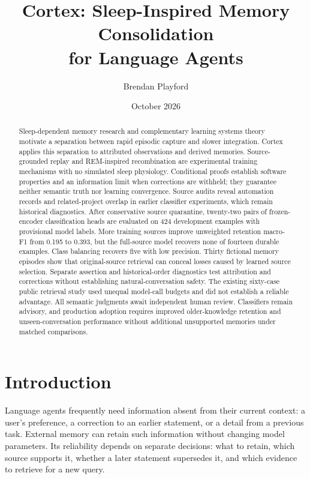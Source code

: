 \documentclass[11pt]{article}
\title{Cortex: Sleep-Inspired Memory Consolidation\\for Language Agents}
\author{Brendan Playford}
\date{October 2026}
\begin{document}
\maketitle
\begin{abstract}
Sleep-dependent memory research and complementary learning systems theory motivate a separation between rapid episodic capture and slower integration. Cortex applies this separation to attributed observations and derived memories. Source-grounded replay and REM-inspired recombination are experimental training mechanisms with no simulated sleep physiology. Conditional proofs establish software properties and an information limit when corrections are withheld; they guarantee neither semantic truth nor learning convergence. Source audits reveal automation records and related-project overlap in earlier classifier experiments, which remain historical diagnostics. After conservative source quarantine, twenty-two pairs of frozen-encoder classification heads are evaluated on 424 development examples with provisional model labels. More training sources improve unweighted retention macro-F1 from 0.195 to 0.393, but the full-source model recovers none of fourteen durable examples. Class balancing recovers five with low precision. Thirty fictional memory episodes show that original-source retrieval can conceal losses caused by learned source selection. Separate assertion and historical-order diagnostics test attribution and corrections without establishing natural-conversation safety. The existing sixty-case public retrieval study used unequal model-call budgets and did not establish a reliable advantage. All semantic judgments await independent human review. Classifiers remain advisory, and production adoption requires improved older-knowledge retention and unseen-conversation performance without additional unsupported memories under matched comparisons.
\end{abstract}

\section{Introduction}
Language agents frequently need information absent from their current context: a user's preference, a correction to an earlier statement, or a detail from a previous task. External memory can retain such information without changing model parameters. Its reliability depends on separate decisions: what to retain, which source supports it, whether a later statement supersedes it, and which evidence to retrieve for a new query.
\end{document}
